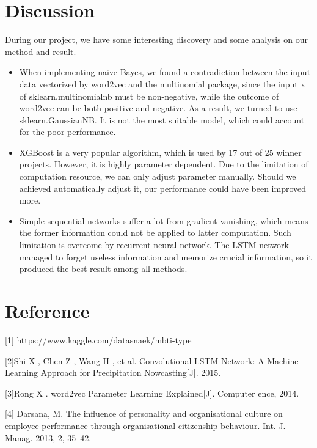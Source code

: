 \documentclass{article}
\begin{document}
\section{Discussion}
During our project, we have some interesting discovery and some analysis on our method and result.
\begin{itemize}
	\item When implementing naive Bayes, we found a contradiction between the input data vectorized by word2vec and the multinomial package, since the input x of sklearn.multinomialnb must be non-negative, while the outcome of word2vec can be both positive and negative. As a result, we turned to use sklearn.GaussianNB. It is not the most suitable model, which could account for the poor performance.
	\item XGBoost is a very popular algorithm, which is used by 17 out of 25 winner projects. However, it is highly parameter dependent. Due to the limitation of computation resource, we can only adjust parameter manually. Should we achieved automatically adjust it, our performance could have been improved more.
	\item Simple sequential networks suffer a lot from gradient vanishing, which means the former information could not be applied to latter computation. Such limitation is overcome by recurrent neural network. The LSTM network managed to forget useless information and memorize crucial information, so it produced the best result among all methods.
\end{itemize}




\section{Reference}


\small

[1] https://www.kaggle.com/datasnaek/mbti-type

[2]Shi X , Chen Z , Wang H , et al. Convolutional LSTM Network: A Machine Learning Approach for Precipitation Nowcasting[J]. 2015.

[3]Rong X . word2vec Parameter Learning Explained[J]. Computer ence, 2014.

[4] Darsana, M. The influence of personality and organisational culture on employee performance through organisational citizenship behaviour. Int. J. Manag. 2013, 2, 35–42. 
\end{document}
